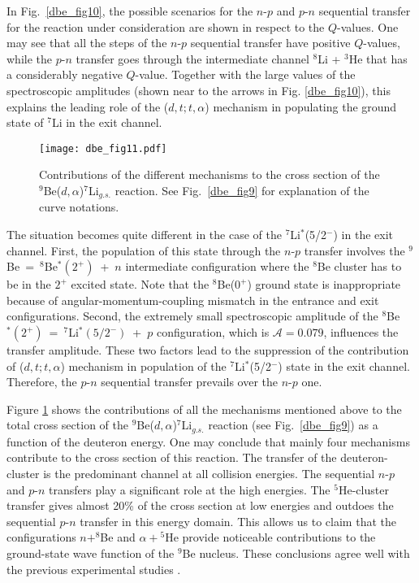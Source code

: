 \documentclass[
12pt, %
oneside, %
english, %
onehalfspacing, %
onehalfspacing, %
headsepline, %
]{MastersDoctoralThesis} %
\begin{document}
In Fig.~\ref{dbe_fig10}, the possible scenarios for the $n$-$p$ and $p$-$n$ sequential transfer for the reaction under consideration are shown in respect to the $Q$-values. One may see that all the steps of the $n$-$p$ sequential transfer have positive $Q$-values, while the $p$-$n$ transfer goes through the intermediate channel ${}^8$Li + ${}^3$He that has a considerably negative $Q$-value. Together with the large values of the spectroscopic amplitudes (shown near to the arrows in Fig. \ref{dbe_fig10}), this explains the leading role of the ($d,t;t,\alpha$) mechanism in populating the ground state of ${}^7$Li in the exit channel.

\begin{figure}[tp]
\centering
\texttt{[image: dbe\_fig11.pdf]}
\decoRule
\caption{\label{dbe_fig11} \footnotesize Contributions of the different mechanisms to the cross section of the ${}^9$Be($d,\alpha$)${}^7$Li$_{g.s.}$ reaction. See Fig.~\ref{dbe_fig9} for explanation of the curve notations.}
\end{figure}	

The situation becomes quite different in the case of the ${}^7$Li$^*$(5/2$^-$) in the exit channel. First, the population of this state through the $n$-$p$ transfer involves the ${}^9$Be~=~${}^8$Be$^*(2^+)$~+~$n$ intermediate configuration where the ${}^8$Be cluster has to be in the $2^+$ excited state. Note that the ${}^8$Be($0^+$) ground state is inappropriate because of angular-momentum-coupling mismatch in the entrance and exit configurations. Second, the extremely small spectroscopic amplitude of the ${}^8$Be$^*(2^+)$~=~${}^7$Li$^*(5/2^-)$~+~$p$ configuration, which is $\mathcal{A} = 0.079$, influences the transfer amplitude. These two factors lead to the suppression of the contribution of ($d,t;t,\alpha$) mechanism in population of the ${}^7$Li$^*$(5/2$^-$) state in the exit channel. Therefore, the $p$-$n$ sequential transfer prevails over the $n$-$p$ one. 

Figure \ref{dbe_fig11} shows the contributions of all the mechanisms mentioned above to the total cross section of the ${}^9$Be($d,\alpha$)${}^7$Li$_{g.s.}$ reaction (see Fig.~\ref{dbe_fig9}) as a function of the deuteron energy. One may conclude that mainly four mechanisms contribute to the cross section of this reaction. The transfer of the deuteron-cluster is the predominant channel at all collision energies. The sequential $n$-$p$ and $p$-$n$ transfers play a significant role at the high energies. The ${}^5$He-cluster transfer gives almost 20\% of the cross section at low energies and outdoes the sequential $p$-$n$ transfer in this energy domain. This allows us to claim that the configurations $n+^8$Be and $\alpha+{}^5$He provide noticeable contributions to the ground-state wave function of the ${}^9$Be nucleus. These conclusions agree well with the previous experimental studies \cite{brown2007, papka2007}.
\end{document}
